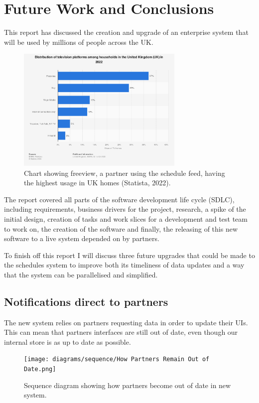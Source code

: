 \section{Future Work and Conclusions}
\label{sec:future}
This report has discussed the creation and upgrade of an enterprise system that will be used by millions of people across the UK.

\begin{figure}[H]
  \centering
  \includegraphics[width=8cm]{assets/tvPlatformChart.png}
  \caption{Chart showing freeview, a partner using the schedule feed, having the highest usage in UK homes (Statista, 2022).}
  \label{fig:tvPlatformChart}
\end{figure}

The report covered all parts of the software development life cycle (SDLC), including requirements, business drivers for the project, research,
a spike of the initial design, creation of tasks and work slices for a development and test team to work on, the creation of the software and
finally, the releasing of this new software to a live system depended on by partners.

To finish off this report I will discuss three future upgrades that could be made to the schedules system to improve both its timeliness of data updates
and a way that the system can be parallelised and simplified.

\subsection{Notifications direct to partners}
The new system relies on partners requesting data in order to update their UIs. This can mean that partners interfaces are still out of date, even 
though our internal store is as up to date as possible.

\begin{figure}[H]
  \centering
  \texttt{[image: diagrams/sequence/How Partners Remain Out of Date.png]}
  \caption{Sequence diagram showing how partners become out of date in new system.}
  \label{fig:sequenceOutOfDate}
\end{figure}

